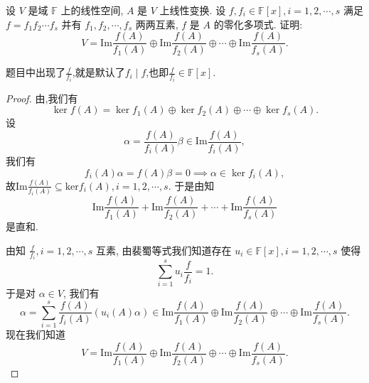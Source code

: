 \documentclass[../../main.tex]{subfiles}
\begin{document}
\begin{example}
设 $V$ 是域 $\mathbb{F}$ 上的线性空间, $A$ 是 $V$ 上线性变换. 设 $f, f_i \in \mathbb{F}[x], i = 1, 2, \cdots, s$ 满足 $f = f_1f_2\cdots f_s$ 并有 $f_1, f_2, \cdots, f_s$ 两两互素, $f$ 是 $A$ 的零化多项式. 证明:
$$
V = \mathrm{Im} \frac{f(A)}{f_1(A)} \oplus \mathrm{Im} \frac{f(A)}{f_2(A)} \oplus \cdots \oplus \mathrm{Im} \frac{f(A)}{f_s(A)}.
$$
\end{example}
\begin{remark}
题目中出现了$\frac{f}{f_i}$,就是默认了$f_i\mid f$,也即$\frac{f}{f_i}\in \mathbb{F}[x]$.
\end{remark}
\begin{proof}
由,我们有
$$
\ker f(A) = \ker f_1(A) \oplus \ker f_2(A) \oplus \cdots \oplus \ker f_s(A).
$$
设
$$
\alpha = \frac{f(A)}{f_i(A)} \beta \in \mathrm{Im} \frac{f(A)}{f_i(A)},
$$
我们有
$$
f_i(A) \alpha = f(A) \beta = 0 \implies \alpha \in \ker f_i(A),
$$
故$\mathrm{Im}\frac{f\left( A \right)}{f_i\left( A \right)}\subseteq \mathrm{ker}f_i\left( A \right) ,i=1,2,\cdots ,s.$
于是由知
$$
\mathrm{Im} \frac{f(A)}{f_1(A)} + \mathrm{Im} \frac{f(A)}{f_2(A)} + \cdots + \mathrm{Im} \frac{f(A)}{f_s(A)}
$$
是直和.

由知 $\frac{f}{f_i}, i = 1, 2, \cdots, s$ 互素, 由裴蜀等式我们知道存在 $u_i \in \mathbb{F}[x], i = 1, 2, \cdots, s$ 使得
$$
\sum_{i=1}^s u_i \frac{f}{f_i} = 1.
$$
于是对 $\alpha \in V$, 我们有
$$
\alpha = \sum_{i=1}^s \frac{f(A)}{f_i(A)} (u_i(A) \alpha) \in \mathrm{Im} \frac{f(A)}{f_1(A)} \oplus \mathrm{Im} \frac{f(A)}{f_2(A)} \oplus \cdots \oplus \mathrm{Im} \frac{f(A)}{f_s(A)}.
$$
现在我们知道
$$
V = \mathrm{Im} \frac{f(A)}{f_1(A)} \oplus \mathrm{Im} \frac{f(A)}{f_2(A)} \oplus \cdots \oplus \mathrm{Im} \frac{f(A)}{f_s(A)}.
$$
\end{proof}
\end{document}
